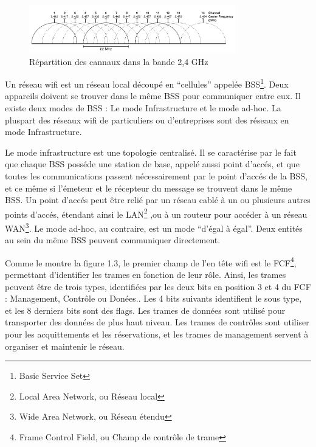 \begin{figure}
   \centering
   \includegraphics[width=0.8\textwidth,natwidth=610,natheight=642]{images/cannaux.png}
   \caption{Répartition des cannaux dans la bande 2,4 GHz}
\end{figure}

Un réseau wifi est un réseau local découpé en ``cellules'' appelée BSS\footnote{Basic Service Set}. Deux appareils
doivent se trouver dans le même BSS pour communiquer entre eux. Il existe deux modes de BSS : Le mode Infrastructure et le
mode ad-hoc\cite{WFfunc2}. La pluspart des réseaux wifi de particuliers ou d'entreprises sont des réseaux en mode Infrastructure.

Le mode infrastructure est une topologie centralisé. Il se caractérise par le fait que chaque BSS posséde une station de
base, appelé aussi point d'accés, et que toutes les communications passent nécessairement par le point d'accés de la BSS,
et ce même si l'émeteur et le récepteur du message se trouvent dans le même BSS. Un point d'accés peut être relié par un réseau
cablé à un ou plusieurs autres points d'accés, étendant ainsi le LAN\footnote{Local Area Network, ou Réseau local}
\cite{WFfunc},ou à un routeur pour accéder à un réseau WAN\footnote{Wide Area Network, ou Réseau étendu}.
Le mode ad-hoc, au contraire, est un mode ``d'égal à égal''. Deux entités au sein du même BSS peuvent communiquer directement.


Comme le montre la figure 1.3\cite{WFhead}, le premier champ de l'en tête wifi est le FCF\footnote{Frame Control Field, ou Champ
de contrôle de trame}, permettant d'identifier les trames en fonction de leur rôle. Ainsi, les trames peuvent être de trois types,
identifiées par les deux bits en position 3 et 4 du FCF : Management, Contrôle ou Donées.\cite{WFfcf}. Les 4 bits suivants
identifient le sous type, et les 8 derniers bits sont des flags. Les trames de données sont utilisé pour transporter des données
de plus haut niveau. Les trames de contrôles sont utiliser pour les acquittements et les réservations, et les trames de management
servent à organiser et maintenir le réseau\cite{MNfunc}.

